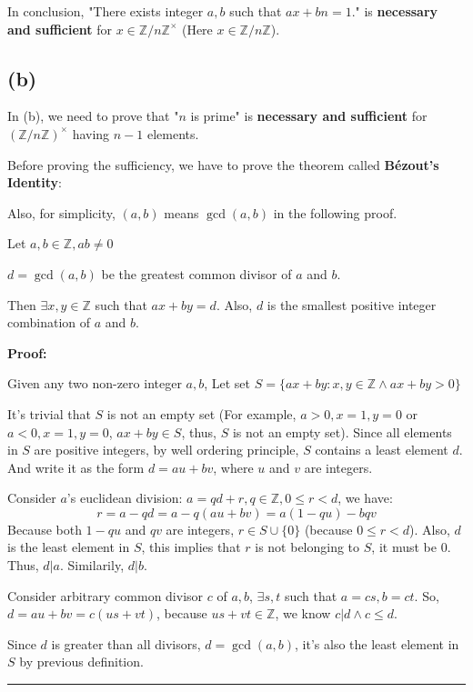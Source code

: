 \documentclass[12pt]{article}
\begin{document}
In conclusion, "There exists integer $a,b$ such that $ax+bn=1$." is \textbf{necessary and sufficient} for $x\in\mathbb{Z}/n\mathbb{Z}^{\times}$ (Here $x\in\mathbb{Z}/n\mathbb{Z}$).
\subsection*{(b)}
In (b), we need to prove that "$n$ is prime" is \textbf{necessary and sufficient} for $(\mathbb{Z}/n\mathbb{Z})^{\times}$ having $n-1$ elements.

Before proving the sufficiency, we have to prove the theorem called \textbf{Bézout's Identity}:

Also, for simplicity, $(a,b)$ means $\gcd{(a,b)}$ in the following proof.

\begin{displayquote}
Let $a,b\in\mathbb{Z},ab\ne0$

$d=\gcd{(a,b)}$ be the greatest common divisor of $a$ and $b$. 

Then $\exists x,y\in\mathbb{Z}$ such that $ax+by=d$. Also, $d$ is the smallest positive integer combination of $a$ and $b$.
\end{displayquote}

\noindent\textbf{Proof:}

Given any two non-zero integer $a,b$, Let set $S=\{ax+by:x,y\in\mathbb{Z}\land ax+by>0\}$

It's trivial that $S$ is not an empty set (For example, $a>0,x=1,y=0$ or $a<0,x=1,y=0$, $ax+by\in S$, thus, $S$ is not an empty set). Since all elements in $S$ are positive integers, by well ordering principle, $S$ contains a least element $d$. And write it as the form $d=au+bv$, where $u$ and $v$ are integers.

Consider $a$'s euclidean division: $a=qd+r, q\in\mathbb{Z}, 0\le r < d$, we have:
\[r=a-qd=a-q(au+bv)=a(1-qu)-bqv\]
Because both $1-qu$ and $qv$ are integers, $r\in S\cup \{0\}$ (because $0\le r < d$). Also, $d$ is the least element in $S$, this implies that $r$ is not belonging to $S$, it must be $0$. Thus, $d|a$. Similarily, $d|b$.

Consider arbitrary common divisor $c$ of $a,b$, $\exists s,t$ such that $a=cs,b=ct$. So, $d=au+bv=c(us+vt)$, because $us+vt\in \mathbb{Z}$, we know $c|d\land c\le d$.

Since $d$ is greater than all divisors, $d=\gcd{(a,b)}$, it's also the least element in $S$ by previous definition.

\noindent\rule{\textwidth}{1pt}
\end{document}
